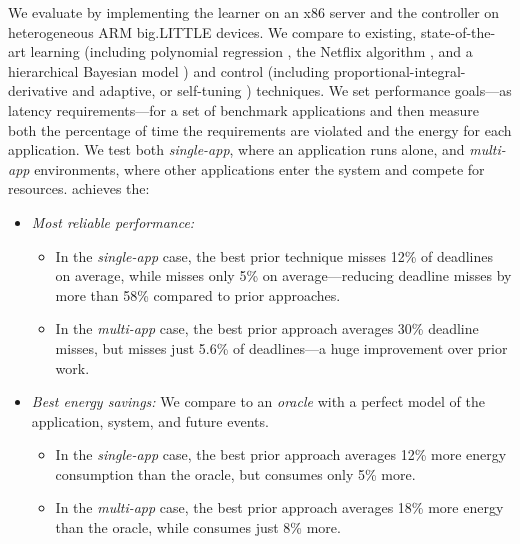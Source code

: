 We evaluate \SYSTEM{} by implementing the learner on an x86 server and
the controller on heterogeneous ARM big.LITTLE devices.  We compare
\SYSTEM{} to existing, state-of-the-art learning (including polynomial
regression \cite{Koala,dubach2010}, the Netflix algorithm
\cite{netflix,Paragon}, and a hierarchical Bayesian model \cite{LEO})
and control (including proportional-integral-derivative
\cite{Hellerstein2004a} and adaptive, or self-tuning
\cite{HandbookControl}) techniques.    We set performance
goals---as latency requirements---for a set of benchmark applications
and then measure both the percentage of time the requirements are
violated and the energy for each application.  We test both
\emph{single-app}, where an application runs alone, and
\emph{multi-app} environments, where other applications enter the
system and compete for resources.  \SYSTEM{} achieves the:
\begin{itemize}[leftmargin=1em]
\item \textit{Most reliable performance:}
  \begin{itemize}[leftmargin=1em]
  \item In the \emph{single-app} case, the best prior technique misses
    12\% of deadlines on average, while \SYSTEM{} misses only 5\% on
    average---reducing deadline misses by more than 58\% compared to
    prior approaches.
  \item In the \emph{multi-app} case, the best prior approach averages
    30\% deadline misses, but \SYSTEM{} misses just 5.6\% of
    deadlines---a huge improvement over prior work.
  \end{itemize}
\item \textit{Best energy savings:} We compare to an \emph{oracle}
  with a perfect model of the application, system, and future events.
  \begin{itemize}[leftmargin=1em]
  \item In the \emph{single-app} case, the best prior approach
    averages 12\% more energy consumption than the oracle, but
    \SYSTEM{} consumes only 5\% more.
  \item In the \emph{multi-app} case, the best prior approach averages
    18\% more energy than the oracle, while \SYSTEM{} consumes just
    8\% more.
  \end{itemize}
\end{itemize}

